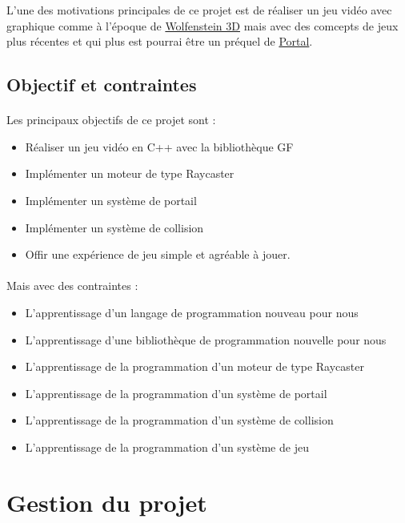 \documentclass[12pt]{report}
\begin{document}
L'une des motivations principales de ce projet est de réaliser un jeu vidéo
avec graphique comme à l'époque de \href{https://fr.wikipedia.org/wiki/Wolfenstein_3D}{Wolfenstein 3D} 
mais avec des comcepts de jeux plus récentes et qui plus est pourrai être
un préquel de \href{https://fr.wikipedia.org/wiki/Portal_(jeu_vid%C3%A9o)}{Portal}.


\subsection{Objectif et contraintes}

\paragraph{}
Les principaux objectifs de ce projet sont :
\begin{itemize}
	\item Réaliser un jeu vidéo en C++ avec la bibliothèque GF
	\item Implémenter un moteur de type Raycaster
	\item Implémenter un système de portail
	\item Implémenter un système de collision
	\item Offir une expérience de jeu simple et agréable à jouer.
\end{itemize}

\paragraph{}
Mais avec des contraintes :
\begin{itemize}
	\item L'apprentissage d'un langage de programmation nouveau pour nous
	\item L'apprentissage d'une bibliothèque de programmation nouvelle pour nous
	\item L'apprentissage de la programmation d'un moteur de type Raycaster
	\item L'apprentissage de la programmation d'un système de portail
	\item L'apprentissage de la programmation d'un système de collision
	\item L'apprentissage de la programmation d'un système de jeu
\end{itemize}

\section{Gestion du projet}
\end{document}
